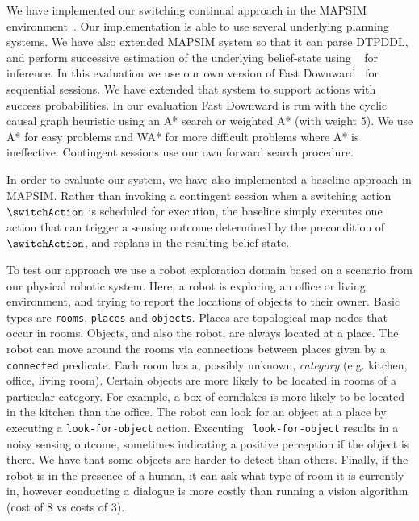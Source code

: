 
We have implemented our switching continual approach in the MAPSIM
environment~\cite{brenner:nebel:jaamas09}. Our implementation is able
to use several underlying planning systems. We have also extended
MAPSIM system so that it can parse DTPDDL, and perform successive
estimation of the underlying belief-state using
~\cite{king:2009} for inference.  In this evaluation
we use our own version of Fast Downward~\cite{fast-downward} for
sequential sessions. We have extended that system to support actions
with success probabilities. In our evaluation Fast Downward is run
with the cyclic causal graph heuristic using an A* search or weighted
A* (with weight 5). We use A* for easy problems and WA* for more
difficult problems where A* is ineffective. Contingent sessions use
our own forward search procedure.



In order to evaluate our system, we have also implemented a baseline
approach in MAPSIM. Rather than invoking a contingent session when a
switching action $\switchAction$ is scheduled for execution, the
baseline simply executes one action that can trigger a sensing outcome
determined by the precondition of $\switchAction$, and replans in the
resulting belief-state.






To test our approach we use a robot exploration domain based on a
scenario from our physical robotic system. Here, a robot is exploring
an office or living environment, and trying to report the locations of
objects to their owner. Basic types are {\tt rooms}, {\tt places} and
{\tt objects}. Places are topological map nodes that occur in rooms.
Objects, and also the robot, are always located at a place. The robot
can move around the rooms via connections between places given by a
{\tt connected} predicate. Each room has a, possibly unknown, {\em
  category} (e.g. kitchen, office, living room). Certain objects are
more likely to be located in rooms of a particular category.  For
example, a box of cornflakes is more likely to be located in the
kitchen than the office. The robot can look for an object at a place
by executing a {\tt look-for-object} action. Executing {\tt
  look-for-object} results in a noisy sensing outcome, sometimes
indicating a positive perception if the object is there. We have that
some objects are harder to detect than others. Finally, if the robot
is in the presence of a human, it can ask what type of room it is
currently in, however conducting a dialogue is more costly than
running a vision algorithm (cost of 8 vs costs of 3).

